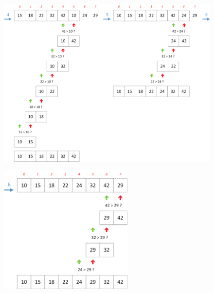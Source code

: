\documentclass[11pt,a4paper]{article}
\begin{document}
\begin{figure}[ht!]
\centering
\centerline{
\includegraphics[width=1.2\textwidth]{img/tris/2_per_pages/InsertionSort_part3.png}
}
\end{figure}

\vfillLast

\clearpage

\begin{figure}[ht!]
\centering
\centerline{
\includegraphics[width=0.6\textwidth]{img/tris/2_per_pages/InsertionSort_part4.png}
}
\end{figure}
\end{document}
